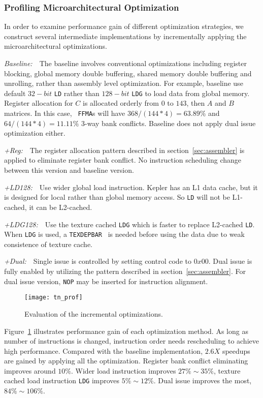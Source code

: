 \subsubsection{Profiling Microarchitectural Optimization}
In order to examine performance gain of different optimization strategies, we construct several intermediate 
implementations by incrementally applying the microarchitectural optimizations.

{\it Baseline:}~~The baseline involves conventional optimizations including register blocking, global
memory double buffering, shared memory double buffering and unrolling, rather than assembly level optimization.
For example, baseline use default $32-bit$ {\tt LD} rather than $128-bit$ {\tt LDG} to load data from global memory.
Register allocation for $C$ is allocated orderly from $0$ to $143$, then $A$ and $B$ matrices. In this case, {\tt
FFMA}s will have $368/(144*4)=63.89\%$ and $64/(144*4)=11.11\%$ 3-way bank conflicts. Baseline does not apply dual
issue optimization either.

{\it +Reg:}~~The register allocation pattern described in section~\ref{sec:assembler} is applied to eliminate register 
bank conflict. No
instruction scheduling change between this version and baseline version.

{\it +LD128:}~~Use wider global load instruction.
Kepler has an L1 data cache, but it is designed for local rather than global memory access. So {\tt LD} will not be 
L1-cached, it can be L2-cached.

{\it +LDG128:}~~Use the texture cached {\tt LDG} which is faster to replace L2-cached {\tt LD}. When {\tt LDG} is used, 
a {\tt TEXDEPBAR}~\cite{lukyanov2014efficient} is needed before using the data due to weak consistence of texture cache.

{\it +Dual:}~~Single issue is controlled by setting control code to $0x00$. Dual issue is fully enabled by utilizing the
pattern described in section~\ref{sec:assembler}. For dual issue version, {\tt NOP} may be inserted for instruction 
alignment.

\begin{figure}[htbp]
\begin{center}
\texttt{[image: tn\_prof]}
    \caption{Evaluation of the incremental optimizations.}
\label{fig:th_prof}
\end{center}
\end{figure}

Figure~\ref{fig:th_prof} illustrates performance gain of each optimization method.
As long as number of instructions is changed, instruction order needs rescheduling to achieve high performance.
Compared with the baseline implementation, $2.6X$ speedups are gained by applying all the optimization.
Register bank conflict eliminating improves around $10\%$. Wider load instruction improves $27\%\sim35\%$, texture 
cached
load instruction {\tt LDG} improves $5\%\sim12\%$. Dual issue improves the most, $84\%\sim106\%$.

